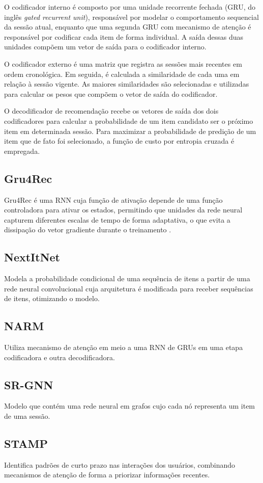 O codificador interno é composto por uma unidade recorrente fechada (GRU, do
inglês \textit{gated recurrent unit}), responsável por modelar
o comportamento sequencial da sessão atual, enquanto que uma segunda GRU com
mecanismo de atenção é responsável por codificar cada item de forma individual.
A saída dessas duas unidades compõem um vetor de saída para o codificador interno.

O codificador externo é uma matriz que registra as sessões mais recentes em
ordem cronológica. Em seguida, é calculada a similaridade de cada uma em relação
à sessão vigente. As maiores similaridades são selecionadas e utilizadas para
calcular os pesos que compõem o vetor de saída do codificador.

O decodificador de recomendação recebe os vetores de saída dos dois
codificadores para calcular a probabilidade de um item candidato ser o próximo
item em determinada sessão. Para maximizar a probabilidade de predição de um
item que de fato foi selecionado, a função de custo por entropia cruzada é
empregada.

\subsection{Gru4Rec}
Gru4Rec é uma RNN cuja função de ativação depende de uma
função controladora para ativar os estados, permitindo que unidades
da rede neural capturem diferentes escalas de tempo de forma
adaptativa, o que evita a dissipação do vetor gradiente durante o
treinamento \cite{gru4rec_1} \cite{gru4rec_2}.


\subsection{NextItNet}
Modela a probabilidade condicional de uma
        sequência de itens a partir de uma rede neural convolucional cuja
        arquitetura é modificada para receber sequências de itens, otimizando
        o modelo\cite{nextitnet}.
\subsection{NARM}
Utiliza mecanismo de atenção em meio a
        uma RNN de GRUs em uma etapa codificadora e outra decodificadora\cite{narm}.

\subsection{SR-GNN}
Modelo que contém uma rede neural em grafos
cujo cada nó representa um item de uma sessão\cite{gnn}.

\subsection{STAMP}
Identifica padrões de curto prazo nas interações
        dos usuários, combinando mecanismos de atenção de forma a priorizar
        informações recentes\cite{stamp}.
